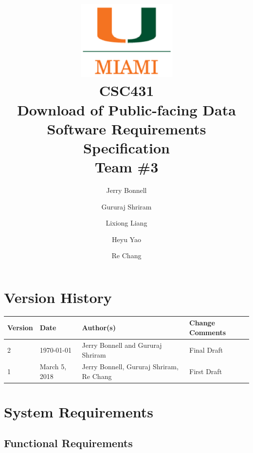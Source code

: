 \documentclass{article}
\begin{document}
\title{
	\includegraphics{images/um_logo.png} \\
	\vspace{0.1in}
	CSC431 \\
	\vspace{0.2in}
	\textbf{Download of Public-facing Data} \\
	\large Software Requirements Specification \\
	Team \#3
}

\author{
	Jerry Bonnell
	\and Gururaj Shriram
	\and Lixiong Liang
	\and Heyu Yao
	\and Re Chang
}

\date{}
\maketitle

\clearpage
\section*{Version History}

\begin{tabularx}{\textwidth}{| l | l | X | l |}
	\hline
	\textbf{Version} & \textbf{Date} & \textbf{Author(s)} & \textbf{Change Comments} \\
	\hline
	2 & \today & Jerry Bonnell and Gururaj Shriram & Final Draft \\
	\hline
	1 & March 5, 2018 & Jerry Bonnell, Gururaj Shriram, Re Chang & First Draft \\
	\hline
\end{tabularx}

\clearpage
\tableofcontents

\clearpage
\listoffigures
\listoftables

\clearpage

\section{System Requirements}

\subsection{Functional Requirements}
\end{document}

